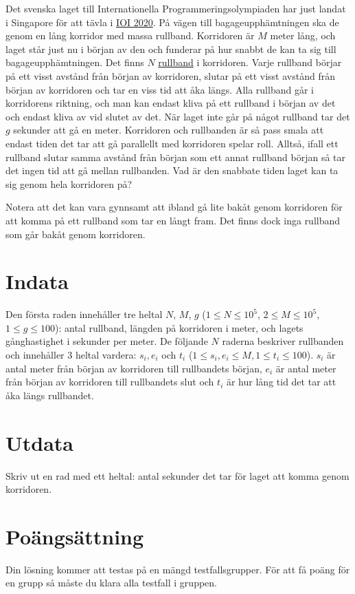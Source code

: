 Det svenska laget till Internationella Programmeringsolympiaden har just landat i Singapore för att
tävla i \href{https://ioi2020.sg/}{IOI 2020}.
På vägen till bagageupphämtningen ska de genom en lång korridor med massa rullband.
Korridoren är $M$ meter lång, och laget står just nu i början av den och funderar på
hur snabbt de kan ta sig till bagageupphämtningen.
Det finns $N$ \href{https://sv.wikipedia.org/wiki/Rullande_trottoar}{rullband} i korridoren.
Varje rullband börjar på ett visst avstånd från början av korridoren,
slutar på ett visst avstånd från början av korridoren och tar en viss tid att åka längs.
Alla rullband går i korridorens riktning, och man kan endast kliva på ett rullband i början av det och endast kliva av vid slutet av det.
När laget inte går på något rullband tar det $g$ sekunder att gå en meter.
Korridoren och rullbanden är så pass smala att endast tiden det tar att gå
parallellt med korridoren spelar roll. 
Alltså, ifall ett rullband slutar samma avstånd från början
som ett annat rullband början så tar det ingen tid att gå mellan
rullbanden. Vad är den snabbate tiden laget kan ta sig genom hela korridoren på?

Notera att det kan vara gynnsamt att ibland gå lite bakåt genom korridoren för att komma på
ett rullband som tar en långt fram. Det finns dock inga rullband som går bakåt genom
korridoren.

\section*{Indata}
Den första raden innehåller tre heltal $N$, $M$, $g$ ($1 \le N \le 10^5$, $2 \le M \le 10^5$, $1 \le g \le 100$):
antal rullband, längden på korridoren i meter, och lagets gånghastighet i sekunder per meter.
De följande $N$ raderna beskriver rullbanden och innehåller 3 heltal vardera: $s_i, e_i$ och $t_i$
($1\leq s_i,e_i\leq M,1\leq t_i\leq100$).
$s_i$ är antal meter från början av korridoren till rullbandets början, $e_i$ är antal meter
från början av korridoren till rullbandets slut och $t_i$ är hur lång tid det tar att åka längs rullbandet.

\section*{Utdata}
Skriv ut en rad med ett heltal: antal sekunder det tar för laget att komma genom korridoren.

\section*{Poängsättning}
Din lösning kommer att testas på en mängd testfallsgrupper.
För att få poäng för en grupp så måste du klara alla testfall i gruppen.

